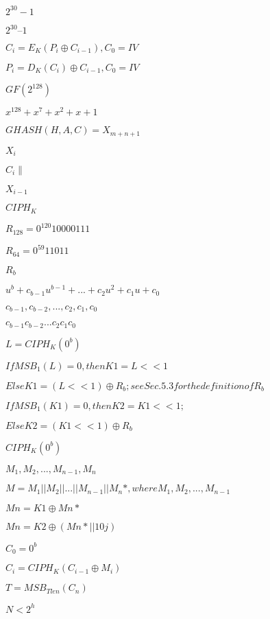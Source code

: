 \documentclass{article}
\begin{document}
${2}^{30}-1$
\pagebreak

${2}^{30}–1$
\pagebreak

${C}_{i}={E}_{K}(P_{i}\oplus C_{i-1}),C_{0}=IV$
\pagebreak

$P_{i}=D_{K}(C_{i})\oplus C_{i-1},C_{0}=IV$
\pagebreak

$GF({2}^{128})$
\pagebreak

${x}^{128}+{x}^{7}+{x}^{2}+x+1$
\pagebreak

$GHASH(H,A,C)=X_{m+n+1}$
\pagebreak

$X_{i}$
\pagebreak

$C_{i} \parallel$
\pagebreak

$ X_{i−1} $
\pagebreak

${CIPH}_{K}$
\pagebreak

${R}_{128} = {0}^{120}10000111$
\pagebreak

${R}_{64} = {0}^{59}11011$
\pagebreak

${R}_{b}$
\pagebreak

${u}^{b}+{c}_{b-1}{u}^{b-1}+...+{c}_{2}{u}^{2}+{c}_{1}u+{c}_{0}$
\pagebreak

${c}_{b-1}, {c}_{b-2}, ..., {c}_{2}, {c}_{1}, {c}_{0}$
\pagebreak

${c}_{b-1}{c}_{b-2}...{c}_{2}{c}_{1}{c}_{0}$
\pagebreak

$L = {CIPH}_{K}({0}^{b})$
\pagebreak

$If {MSB}_{1}(L) = 0, then K1 = L << 1$
\pagebreak

$Else K1 = (L << 1) \oplus {R}_{b}; see Sec. 5.3 for the definition of {R}_{b}$
\pagebreak

$If {MSB}_{1}(K1) = 0, then K2 = K1 << 1;$
\pagebreak

$Else K2 = (K1 << 1) \oplus {R}_{b}$
\pagebreak

${CIPH}_{K}({0}^{b})$
\pagebreak

${M}_{1}, {M}_{2}, ... , {M}_{n-1}, {M}_{n}$
\pagebreak

$M = {M}_{1} || {M}_{2} || ... || {M}_{n-1} || {M}_{n}*, where {M}_{1}, {M}_{2},...,{M}_{n-1}$
\pagebreak

$Mn = K1 \oplus Mn*$
\pagebreak

$Mn = K2 \oplus (Mn*||10j)$
\pagebreak

${C}_{0} = {0}^{b}$
\pagebreak

${C}_{i} = {CIPH}_{K}({C}_{i-1}\oplus{M}_{i})$
\pagebreak

$T = {MSB}_{Tlen}({C}_{n})$
\pagebreak

$ N < {2}^{h} $
\pagebreak
\end{document}
